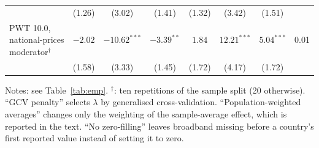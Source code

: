 \documentclass[pdflatex,sn-basic]{sn-jnl}%
\theoremstyle{thmstyleone}
\theoremstyle{thmstyletwo}
\renewenvironment{table}[1][]{\begin{tableorg}[#1]\centering\tablebodyfont}{\end{tableorg}}
\begin{document}
\begin{appendices}
\begin{table}[!p]
{\begin{threeparttable}
\begin{tabular}{lccccccc}
 & (1.26) & (3.02) & (1.41) & (1.32) & (3.42) & (1.51) & \\
\quad PWT 10.0, national-prices moderator$^{\dagger}$ & $-2.02$ & $-10.62^{***}$ & $-3.39^{**}$ & $1.84$ & $12.21^{***}$ & $5.04^{***}$ & 0.01\\
 & (1.58) & (3.33) & (1.45) & (1.72) & (4.17) & (1.72) & \\
\bottomrule
\end{tabular}
\begin{tablenotes}\scriptsize
\item Notes: see Table~\ref{tab:emp}. $^{\dagger}$: ten repetitions of the sample split (20 otherwise). ``GCV penalty'' selects $\lambda$ by generalised cross-validation. ``Population-weighted averages'' changes only the weighting of the sample-average effect, which is reported in the text. ``No zero-filling'' leaves broadband missing before a country's first reported value instead of setting it to zero.
\end{tablenotes}
\end{threeparttable}}
\end{table}


\end{appendices}
\end{document}
